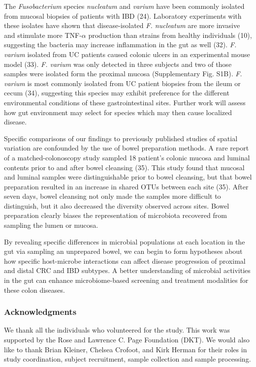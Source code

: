 \documentclass[12pt,]{article}
\begin{document}
The \emph{Fusobacterium} species \emph{nucleatum} and \emph{varium} have
been commonly isolated from mucosal biopsies of patients with IBD (24).
Laboratory experiments with these isolates have shown that
disease-isolated \emph{F. nucleatum} are more invasive and stimulate
more TNF-\(\alpha\) production than strains from healthy individuals
(10), suggesting the bacteria may increase inflammation in the gut as
well (32). \emph{F. varium} isolated from UC patients caused colonic
ulcers in an experimental mouse model (33). \emph{F. varium} was only
detected in three subjects and two of those samples were isolated form
the proximal mucosa (Supplementary Fig. S1B). \emph{F. varium} is most
commonly isolated from UC patient biopsies from the ileum or cecum (34),
suggesting this species may exhibit preference for the different
environmental conditions of these gastrointestinal sites. Further work
will assess how gut environment may select for species which may then
cause localized disease.

Specific comparisons of our findings to previously published studies of
spatial variation are confounded by the use of bowel preparation
methods. A rare report of a matched-colonoscopy study sampled 18
patient's colonic mucosa and luminal contents prior to and after bowel
cleansing (35). This study found that mucosal and luminal samples were
distinguishable prior to bowel cleansing, but that bowel preparation
resulted in an increase in shared OTUs between each site (35). After
seven days, bowel cleansing not only made the samples more difficult to
distinguish, but it also decreased the diversity observed across sites.
Bowel preparation clearly biases the representation of microbiota
recovered from sampling the lumen or mucosa.

By revealing specific differences in microbial populations at each
location in the gut via sampling an unprepared bowel, we can begin to
form hypotheses about how specific host-microbe interactions can affect
disease progression of proximal and distal CRC and IBD subtypes. A
better understanding of microbial activities in the gut can enhance
microbiome-based screening and treatment modalities for these colon
diseases.

\subsubsection{Acknowledgments}\label{acknowledgments}

We thank all the individuals who volunteered for the study. This work
was supported by the Rose and Lawrence C. Page Foundation (DKT). We
would also like to thank Brian Kleiner, Chelsea Crofoot, and Kirk Herman
for their roles in study coordination, subject recruitment, sample
collection and sample processing.
\end{document}
